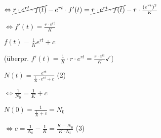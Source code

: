 \documentclass[18pt,a4paper]{scrreprt}
\begin{document}
$\Leftrightarrow \cancel{r\cdot e^{rt} \cdot f(t)} - e^{rt} \cdot f'(t) = \cancel{r\cdot e^{rt} \cdot f(t)} - r\cdot \frac{(e^{rt})^2}{K}$

$\Leftrightarrow f'(t) = \frac{r\cdot e^{rt}}{K}$

$f(t) = \frac{1}{K} e^{rt} + c$

(überpr. $f'(t) = \frac{1}{K} \cdot r \cdot e^{rt} = \frac{r\cdot e^{rt}}{K} \checkmark$)

$N(t)= \frac{e^{rt}}{\frac{1}{K}\cdot e^{rt} + c}$ (2)

$\Leftrightarrow \frac{1}{N_0} = \frac{1}{K} + c$

$N(0) = \frac{1}{\frac{1}{K} + c} = N_0$

$\Leftrightarrow c = \frac{1}{N_0} - \frac{1}{K} = \frac{K-N_0}{K\cdot N_0}$ (3)
\end{document}
